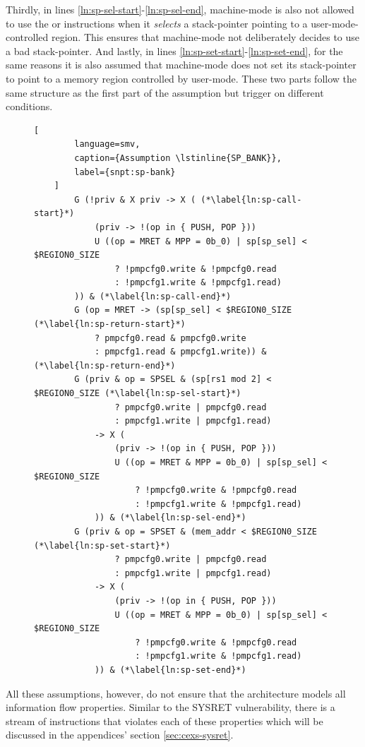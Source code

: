Thirdly, in lines \ref{ln:sp-sel-start}-\ref{ln:sp-sel-end}, machine-mode is also not allowed to use the  or  instructions when it \textit{selects} a stack-pointer pointing to a user-mode-controlled region.
This ensures that machine-mode not deliberately decides to use a bad stack-pointer.
And lastly, in lines \ref{ln:sp-set-start}-\ref{ln:sp-set-end}, for the same reasons it is also assumed that machine-mode does not set its stack-pointer to point to a memory region controlled by user-mode.
These two parts follow the same structure as the first part of the  assumption but trigger on different conditions.

\begin{figure}
    \begin{lstlisting}[
        language=smv,
        caption={Assumption \lstinline{SP_BANK}},
        label={snpt:sp-bank}
    ]
        G (!priv & X priv -> X ( (*\label{ln:sp-call-start}*)
            (priv -> !(op in { PUSH, POP }))
            U ((op = MRET & MPP = 0b_0) | sp[sp_sel] < $REGION0_SIZE
                ? !pmpcfg0.write & !pmpcfg0.read
                : !pmpcfg1.write & !pmpcfg1.read)
        )) & (*\label{ln:sp-call-end}*)
        G (op = MRET -> (sp[sp_sel] < $REGION0_SIZE (*\label{ln:sp-return-start}*)
            ? pmpcfg0.read & pmpcfg0.write
            : pmpcfg1.read & pmpcfg1.write)) & (*\label{ln:sp-return-end}*)
        G (priv & op = SPSEL & (sp[rs1 mod 2] < $REGION0_SIZE (*\label{ln:sp-sel-start}*)
                ? pmpcfg0.write | pmpcfg0.read
                : pmpcfg1.write | pmpcfg1.read)
            -> X (
                (priv -> !(op in { PUSH, POP }))
                U ((op = MRET & MPP = 0b_0) | sp[sp_sel] < $REGION0_SIZE
                    ? !pmpcfg0.write & !pmpcfg0.read
                    : !pmpcfg1.write & !pmpcfg1.read)
            )) & (*\label{ln:sp-sel-end}*)
        G (priv & op = SPSET & (mem_addr < $REGION0_SIZE (*\label{ln:sp-set-start}*)
                ? pmpcfg0.write | pmpcfg0.read
                : pmpcfg1.write | pmpcfg1.read)
            -> X (
                (priv -> !(op in { PUSH, POP }))
                U ((op = MRET & MPP = 0b_0) | sp[sp_sel] < $REGION0_SIZE
                    ? !pmpcfg0.write & !pmpcfg0.read
                    : !pmpcfg1.write & !pmpcfg1.read)
            )) & (*\label{ln:sp-set-end}*)
    \end{lstlisting}
\end{figure}

All these assumptions, however, do not ensure that the architecture models all information flow properties.
Similar to the SYSRET vulnerability, there is a stream of instructions that violates each of these properties which will be discussed in the appendices' section \ref{sec:cexs-sysret}.

